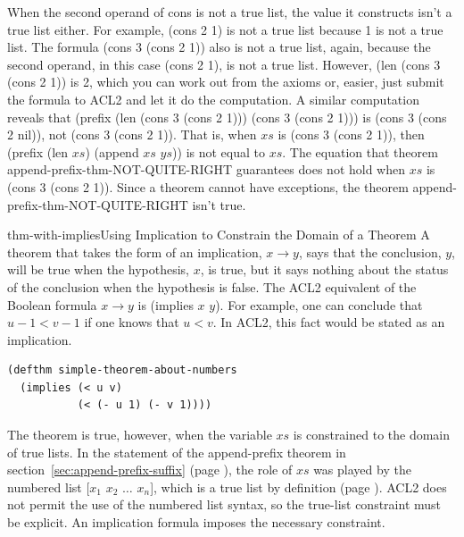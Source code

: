 When the second operand of \textsf{cons} is not a true list,
the value it constructs isn't a true list either.
For example, \textsf{(cons 2 1)} is not a true list because 1 is not a true list.
The formula \textsf{(cons 3 (cons 2 1))} also is not a true list,
again, because the second operand,
in this case \textsf{(cons 2 1)}, is not a true list.
However, \textsf{(len (cons 3 (cons 2 1))} is \textsf{2}, which you can work
out from the axioms or, easier,
just submit the formula to ACL2 and let it do the computation.
A similar computation reveals that
\textsf{(prefix (len (cons 3 (cons 2 1))) (cons 3 (cons 2 1)))}
is \textsf{(cons 3 (cons 2 nil))}, not \textsf{(cons 3 (cons 2 1))}.
That is, when $xs$ is \textsf{(cons 3 (cons 2 1))},
then \textsf{(prefix (len $xs$) (append $xs$ $ys$))} is not equal to $xs$.
The equation that theorem append-prefix-thm-NOT-QUITE-RIGHT
guarantees does not hold when $xs$ is \textsf{(cons 3 (cons 2 1))}.
Since a theorem cannot have exceptions,
the theorem append-prefix-thm-NOT-QUITE-RIGHT
isn't true.

\begin{aside}{thm-with-implies}{Using Implication to Constrain the Domain of a Theorem}
A theorem that takes the form of an implication, $x \rightarrow y$,
says that the conclusion, $y$, will be true when the hypothesis, $x$,
is true, but it says nothing about the status of the conclusion when
the hypothesis is false. The ACL2 equivalent of the Boolean formula $x \rightarrow y$
is \textsf{(implies $x$ $y$)}.
For example, one can conclude that $u - 1 < v - 1$
if one knows that $u < v$.
In ACL2, this fact would be stated as an implication.
\begin{code}
\begin{verbatim}
(defthm simple-theorem-about-numbers
  (implies (< u v)
           (< (- u 1) (- v 1))))
\end{verbatim}
\end{code}
\end{aside}

The theorem is true, however, when the variable $xs$ is
constrained to the domain of true lists.
In the statement of the append-prefix theorem in
section~\ref{sec:append-prefix-suffix} (page \pageref{append-prefix-thm-predicate}),
the role of $xs$ was played by the numbered list
\textsf{[$x_1$ $x_2$ $\dots$ $x_n$]},
which is a true list by definition
(page \pageref{numbered-list-interpretation}).
ACL2 does not permit the use of the numbered list syntax,
so the true-list constraint must be explicit.
An implication formula imposes the necessary constraint.

